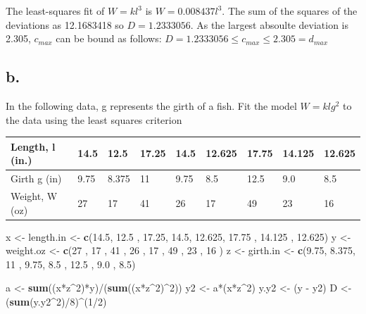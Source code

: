 \documentclass[]{article}
\newenvironment{Shaded}{\begin{snugshade}}{\end{snugshade}}
\newcommand{\KeywordTok}[1]{\textcolor[rgb]{0.13,0.29,0.53}{\textbf{{#1}}}}
\newcommand{\DecValTok}[1]{\textcolor[rgb]{0.00,0.00,0.81}{{#1}}}
\newcommand{\FloatTok}[1]{\textcolor[rgb]{0.00,0.00,0.81}{{#1}}}
\newcommand{\StringTok}[1]{\textcolor[rgb]{0.31,0.60,0.02}{{#1}}}
\newcommand{\NormalTok}[1]{{#1}}
\begin{document}
The least-squares fit of \(W = kl^3\) is \(W = 0.008437l^3\). The sum of
the squares of the deviations as 12.1683418 so \(D = 1.2333056\). As the
largest absoulte deviation is 2.305, \(c_{max}\) can be bound as
follows: \(D = 1.2333056 \leq c_{max} \leq 2.305 = d_{max}\)

\subsection{b.}\label{b.}

In the following data, g represents the girth of a fish. Fit the model
\(W = klg^2\) to the data using the least squares criterion

\begin{table}[!htbp]
\centering
\label{my-label}
\begin{tabular}{l|llllllll}
Length, l (in.) & 14.5 & 12.5 & 17.25 & 14.5 & 12.625 & 17.75 & 14.125 & 12.625 \\ \hline
Girth g (in) & 9.75 & 8.375 & 11 & 9.75 & 8.5 & 12.5 & 9.0 & 8.5 \\ \hline
Weight, W (oz)  & 27   & 17   & 41    & 26   & 17     & 49    & 23     & 16  
\end{tabular}
\end{table}

\begin{Shaded}
\begin{Highlighting}[]
\NormalTok{x <-}\StringTok{ }\NormalTok{length.in <-}\StringTok{ }\KeywordTok{c}\NormalTok{(}\FloatTok{14.5}\NormalTok{, }\FloatTok{12.5} \NormalTok{, }\FloatTok{17.25}\NormalTok{, }\FloatTok{14.5}\NormalTok{, }\FloatTok{12.625}\NormalTok{, }\FloatTok{17.75} \NormalTok{, }\FloatTok{14.125} \NormalTok{, }\FloatTok{12.625}\NormalTok{)}
\NormalTok{y <-}\StringTok{ }\NormalTok{weight.oz <-}\StringTok{ }\KeywordTok{c}\NormalTok{(}\DecValTok{27}  \NormalTok{, }\DecValTok{17}   \NormalTok{, }\DecValTok{41}   \NormalTok{, }\DecValTok{26}  \NormalTok{, }\DecValTok{17}    \NormalTok{, }\DecValTok{49}    \NormalTok{, }\DecValTok{23}     \NormalTok{, }\DecValTok{16} \NormalTok{)}
\NormalTok{z <-}\StringTok{ }\NormalTok{girth.in  <-}\StringTok{ }\KeywordTok{c}\NormalTok{(}\FloatTok{9.75}\NormalTok{, }\FloatTok{8.375}\NormalTok{, }\DecValTok{11}   \NormalTok{, }\FloatTok{9.75}\NormalTok{, }\FloatTok{8.5}   \NormalTok{, }\FloatTok{12.5}  \NormalTok{, }\FloatTok{9.0}    \NormalTok{, }\FloatTok{8.5}\NormalTok{)}

\NormalTok{a <-}\StringTok{ }\KeywordTok{sum}\NormalTok{((x*z^}\DecValTok{2}\NormalTok{)*y)/(}\KeywordTok{sum}\NormalTok{((x*z^}\DecValTok{2}\NormalTok{)^}\DecValTok{2}\NormalTok{))}
\NormalTok{y2 <-}\StringTok{ }\NormalTok{a*(x*z^}\DecValTok{2}\NormalTok{)}
\NormalTok{y.y2 <-}\StringTok{ }\NormalTok{(y -}\StringTok{ }\NormalTok{y2)}
\NormalTok{D <-}\StringTok{ }\NormalTok{(}\KeywordTok{sum}\NormalTok{(y.y2^}\DecValTok{2}\NormalTok{)/}\DecValTok{8}\NormalTok{)^(}\DecValTok{1}\NormalTok{/}\DecValTok{2}\NormalTok{)}
\end{Highlighting}
\end{Shaded}
\end{document}
